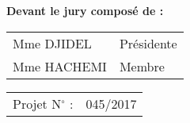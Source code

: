\begin{titlepage}
\begin{center}
\textbf{Devant le jury composé de :}

\vspace{0.5em}

\begin{minipage}[c]{0.5\textwidth}
\begin{tabular}{p{} l}
Mme DJIDEL & Présidente \\
Mme HACHEMI & Membre
\end{tabular}
\end{minipage}

\vfill

\begin{tabular}{l l}
  Projet N$^\circ$ : & 045/2017
\end{tabular}
\end{center}
\end{titlepage}
